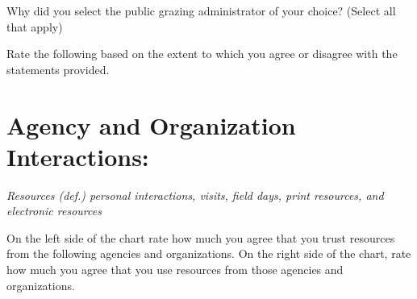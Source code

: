 \documentclass[
  english,
  ]{sdapsclassic}
\begin{document}
\begin{questionnaire}
    \begin{choicequestion}[cols=6]{Why did you select the public grazing administrator of your choice? (Select all that apply)}
    \end{choicequestion}
    
    
     \begin{markgroup}[rowsep=0.33em]{Rate the following based on the extent to which you agree or disagree with the statements provided.}
       {}~{}
       {}~{}
       {}~{}
       {}~{}
       {}~{}
    \end{markgroup}    
    
    \section{Agency and Organization Interactions:}
    
    \emph{Resources (def.) personal interactions, visits, field days, print resources, and electronic resources}
    
    
     On the left side of the chart rate how much you agree that you trust resources from the following agencies and organizations. On the right side of the chart, rate how much you agree that you use resources from those agencies and organizations.
    
    \begin{multicols}{2}
    

\end{multicols}
\end{questionnaire}
\end{document}
